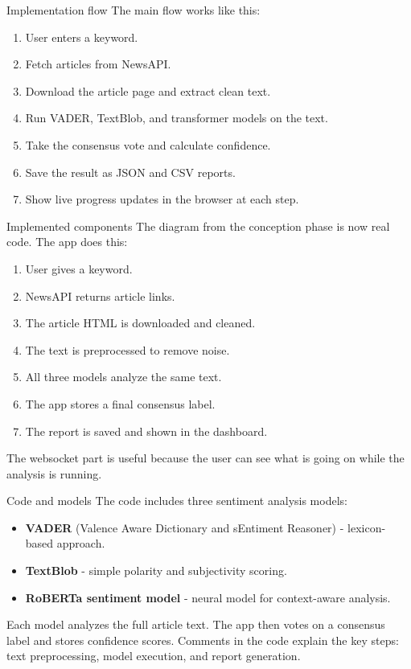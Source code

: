 \documentclass[aspectratio=169]{beamer}
\begin{document}
\begin{frame}{Implementation flow}
The main flow works like this:

\begin{enumerate}
    \item User enters a keyword.
    \item Fetch articles from NewsAPI.
    \item Download the article page and extract clean text.
    \item Run VADER, TextBlob, and transformer models on the text.
    \item Take the consensus vote and calculate confidence.
    \item Save the result as JSON and CSV reports.
    \item Show live progress updates in the browser at each step.
\end{enumerate}
\end{frame}

\begin{frame}{Implemented components}
The diagram from the conception phase is now real code. The app does this:
\begin{enumerate}
    \item User gives a keyword.
    \item NewsAPI returns article links.
    \item The article HTML is downloaded and cleaned.
    \item The text is preprocessed to remove noise.
    \item All three models analyze the same text.
    \item The app stores a final consensus label.
    \item The report is saved and shown in the dashboard.
\end{enumerate}
The websocket part is useful because the user can see what is going on while the analysis is running.
\end{frame}

\begin{frame}{Code and models}
The code includes three sentiment analysis models:

\begin{itemize}
    \item \textbf{VADER} (Valence Aware Dictionary and sEntiment Reasoner) - lexicon-based approach.
    \item \textbf{TextBlob} - simple polarity and subjectivity scoring.
    \item \textbf{RoBERTa sentiment model} - neural model for context-aware analysis.
\end{itemize}

Each model analyzes the full article text. The app then votes on a consensus label and stores confidence scores. Comments in the code explain the key steps: text preprocessing, model execution, and report generation.
\end{frame}
\end{document}
